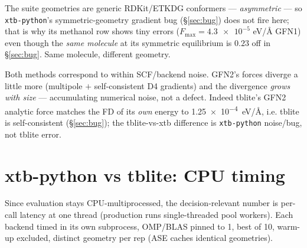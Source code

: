 \documentclass[11pt]{article}
\newcommand{\code}[1]{\texttt{#1}}
\newcommand{\xtbpy}{\code{xtb-python}}
\begin{document}
\medskip\noindent The suite geometries are generic RDKit/ETKDG conformers ---
\emph{asymmetric} --- so \xtbpy{}'s symmetric-geometry gradient bug
(\S\ref{sec:bug}) does not fire here; that is why its methanol row shows tiny
errors ($F_{\max}=\num{4.3e-5}$ eV/\AA{} GFN1) even though the \emph{same molecule}
at its symmetric equilibrium is $0.23$ off in \S\ref{sec:bug}. Same molecule,
different geometry.

\medskip\noindent Both methods correspond to within SCF/backend noise. GFN2's
forces diverge a little more (multipole $+$ self-consistent D4 gradients) and the
divergence \emph{grows with size} --- accumulating numerical noise, not a defect.
Indeed tblite's GFN2 analytic force matches the FD of its \emph{own} energy to
\num{1.25e-4}~eV/\AA, i.e. tblite is self-consistent (\S\ref{sec:bug}); the
tblite-vs-xtb difference is \xtbpy{} noise/bug, not tblite error.

\section{xtb-python vs tblite: CPU timing}
\label{sec:timing}

Since evaluation stays CPU-multiprocessed, the decision-relevant number is
per-call latency at one thread (production runs single-threaded pool workers).
Each backend timed in its own subprocess, OMP/BLAS pinned to 1, best of 10,
warm-up excluded, distinct geometry per rep (ASE caches identical geometries).
\end{document}
